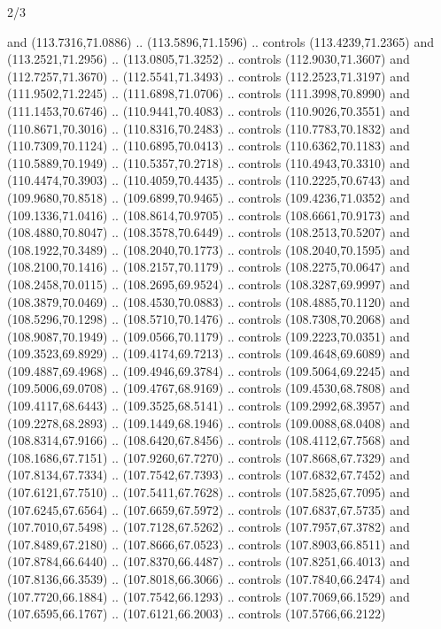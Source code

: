\begin{flagdescription}{2/3}
\begin{scope}[shift={(0.5\flaglength,0.5)},scale=\flagwidth/320]
\begin{scope}[y=0.8pt, x=0.8pt, yscale=-1,shift={(-118.3,-146)}]
  and (113.7316,71.0886) .. (113.5896,71.1596) .. controls (113.4239,71.2365)
  and (113.2521,71.2956) .. (113.0805,71.3252) .. controls (112.9030,71.3607)
  and (112.7257,71.3670) .. (112.5541,71.3493) .. controls (112.2523,71.3197)
  and (111.9502,71.2245) .. (111.6898,71.0706) .. controls (111.3998,70.8990)
  and (111.1453,70.6746) .. (110.9441,70.4083) .. controls (110.9026,70.3551)
  and (110.8671,70.3016) .. (110.8316,70.2483) .. controls (110.7783,70.1832)
  and (110.7309,70.1124) .. (110.6895,70.0413) .. controls (110.6362,70.1183)
  and (110.5889,70.1949) .. (110.5357,70.2718) .. controls (110.4943,70.3310)
  and (110.4474,70.3903) .. (110.4059,70.4435) .. controls (110.2225,70.6743)
  and (109.9680,70.8518) .. (109.6899,70.9465) .. controls (109.4236,71.0352)
  and (109.1336,71.0416) .. (108.8614,70.9705) .. controls (108.6661,70.9173)
  and (108.4880,70.8047) .. (108.3578,70.6449) .. controls (108.2513,70.5207)
  and (108.1922,70.3489) .. (108.2040,70.1773) .. controls (108.2040,70.1595)
  and (108.2100,70.1416) .. (108.2157,70.1179) .. controls (108.2275,70.0647)
  and (108.2458,70.0115) .. (108.2695,69.9524) .. controls (108.3287,69.9997)
  and (108.3879,70.0469) .. (108.4530,70.0883) .. controls (108.4885,70.1120)
  and (108.5296,70.1298) .. (108.5710,70.1476) .. controls (108.7308,70.2068)
  and (108.9087,70.1949) .. (109.0566,70.1179) .. controls (109.2223,70.0351)
  and (109.3523,69.8929) .. (109.4174,69.7213) .. controls (109.4648,69.6089)
  and (109.4887,69.4968) .. (109.4946,69.3784) .. controls (109.5064,69.2245)
  and (109.5006,69.0708) .. (109.4767,68.9169) .. controls (109.4530,68.7808)
  and (109.4117,68.6443) .. (109.3525,68.5141) .. controls (109.2992,68.3957)
  and (109.2278,68.2893) .. (109.1449,68.1946) .. controls (109.0088,68.0408)
  and (108.8314,67.9166) .. (108.6420,67.8456) .. controls (108.4112,67.7568)
  and (108.1686,67.7151) .. (107.9260,67.7270) .. controls (107.8668,67.7329)
  and (107.8134,67.7334) .. (107.7542,67.7393) .. controls (107.6832,67.7452)
  and (107.6121,67.7510) .. (107.5411,67.7628) .. controls (107.5825,67.7095)
  and (107.6245,67.6564) .. (107.6659,67.5972) .. controls (107.6837,67.5735)
  and (107.7010,67.5498) .. (107.7128,67.5262) .. controls (107.7957,67.3782)
  and (107.8489,67.2180) .. (107.8666,67.0523) .. controls (107.8903,66.8511)
  and (107.8784,66.6440) .. (107.8370,66.4487) .. controls (107.8251,66.4013)
  and (107.8136,66.3539) .. (107.8018,66.3066) .. controls (107.7840,66.2474)
  and (107.7720,66.1884) .. (107.7542,66.1293) .. controls (107.7069,66.1529)
  and (107.6595,66.1767) .. (107.6121,66.2003) .. controls (107.5766,66.2122)

\end{scope}
\end{scope}
\end{flagdescription}
